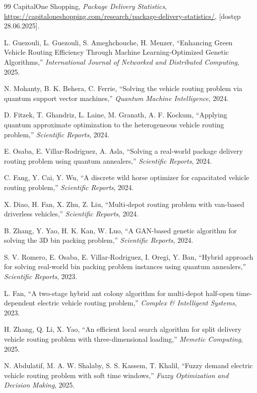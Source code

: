 \begin{thebibliography}{99}
CapitalOne Shopping,
\textit{Package Delivery Statistics},
\url{https://capitaloneshopping.com/research/package-delivery-statistics/},
[dostęp 28.06.2025].

L. Guezouli, L. Guezouli, S. Ameghchouche, H. Menzer,
“Enhancing Green Vehicle Routing Efficiency Through Machine Learning-Optimized Genetic Algorithms,”
\textit{International Journal of Networked and Distributed Computing}, 2025.

N. Mohanty, B. K. Behera, C. Ferrie,
“Solving the vehicle routing problem via quantum support vector machines,”
\textit{Quantum Machine Intelligence}, 2024.

D. Fitzek, T. Ghandriz, L. Laine, M. Granath, A. F. Kockum,
“Applying quantum approximate optimization to the heterogeneous vehicle routing problem,”
\textit{Scientific Reports}, 2024.

E. Osaba, E. Villar-Rodriguez, A. Asla,
“Solving a real-world package delivery routing problem using quantum annealers,”
\textit{Scientific Reports}, 2024.

C. Fang, Y. Cai, Y. Wu,
“A discrete wild horse optimizer for capacitated vehicle routing problem,”
\textit{Scientific Reports}, 2024.

X. Diao, H. Fan, X. Zhu, Z. Liu,
“Multi-depot routing problem with van-based driverless vehicles,”
\textit{Scientific Reports}, 2024.

B. Zhang, Y. Yao, H. K. Kan, W. Luo,
“A GAN-based genetic algorithm for solving the 3D bin packing problem,”
\textit{Scientific Reports}, 2024.

S. V. Romero, E. Osaba, E. Villar-Rodriguez, I. Oregi, Y. Ban,
“Hybrid approach for solving real-world bin packing problem instances using quantum annealers,”
\textit{Scientific Reports}, 2023.

L. Fan,
“A two-stage hybrid ant colony algorithm for multi-depot half-open time-dependent electric vehicle routing problem,”
\textit{Complex \& Intelligent Systems}, 2023.

H. Zhang, Q. Li, X. Yao,
“An efficient local search algorithm for split delivery vehicle routing problem with three-dimensional loading,”
\textit{Memetic Computing}, 2025.

N. Abdulatif, M. A. W. Shalaby, S. S. Kassem, T. Khalil,
“Fuzzy demand electric vehicle routing problem with soft time windows,”
\textit{Fuzzy Optimization and Decision Making}, 2025.


\end{thebibliography}
